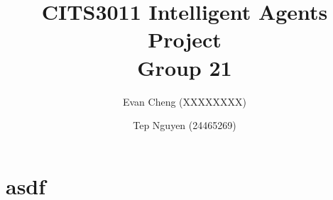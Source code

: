 \documentclass[11pt,a4paper]{article}
\title{CITS3011 Intelligent Agents Project\\
  \large Group 21}
\author{
  Evan Cheng (XXXXXXXX) \and
  Tep Nguyen (24465269) \and
}
\date{}
\begin{document}
\maketitle

\section{asdf}


\end{document}

